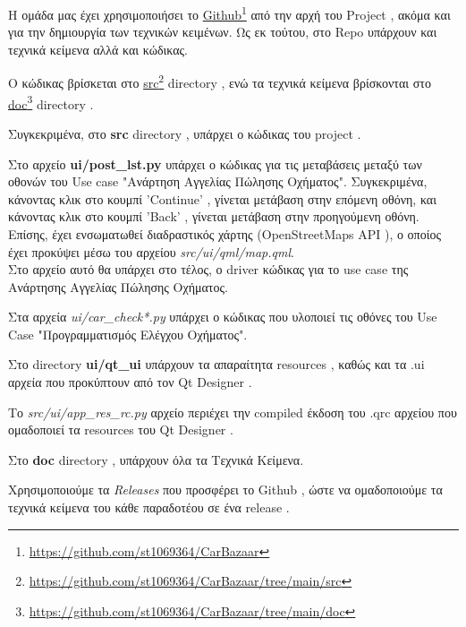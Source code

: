 \documentclass{../ol-softwaremanual}
\newcommand{\doclink}[2]{\href{#1}{#2}\footnote{\url{#1}}}
\begin{document}
	\flushleft
	
	Η ομάδα μας έχει χρησιμοποιήσει το \en \doclink{https://github.com/st1069364/CarBazaar}{Github} \gr από την αρχή του \en Project \gr, ακόμα και για την δημιουργία των τεχνικών κειμένων. Ως εκ τούτου, στο \en Repo \gr υπάρχουν και τεχνικά κείμενα αλλά και κώδικας. \break
	
	
	Ο κώδικας βρίσκεται στο \en \doclink{https://github.com/st1069364/CarBazaar/tree/main/src}{src} directory \gr, ενώ τα τεχνικά κείμενα βρίσκονται στο \en \doclink{https://github.com/st1069364/CarBazaar/tree/main/doc}{doc} directory \gr .\break
	
	Συγκεκριμένα, στο \en \textbf{src} directory \gr, υπάρχει ο κώδικας του \en project \gr. \break
	
	Στο αρχείο \en \textbf{ui/post\_lst.py} \gr υπάρχει ο κώδικας για τις μεταβάσεις μεταξύ των οθονών του \en Use case \gr \en"\gr Ανάρτηση Αγγελίας Πώλησης Οχήματος\en"\gr.  Συγκεκριμένα, κάνοντας κλικ στο κουμπί \en 'Continue' \gr , γίνεται μετάβαση στην επόμενη οθόνη, και κάνοντας κλικ στο κουμπί \en 'Back' \gr , γίνεται μετάβαση στην προηγούμενη οθόνη.
	Επίσης, έχει ενσωματωθεί διαδραστικός χάρτης (\en OpenStreetMaps API \gr), ο οποίος έχει προκύψει μέσω του αρχείου \en \textit{src/ui/qml/map.qml}\gr. \\
	
	Στο αρχείο αυτό θα υπάρχει στο τέλος, ο \en driver \gr κώδικας για το \en use case \gr της Ανάρτησης Αγγελίας Πώλησης Οχήματος. \break
	
	Στα αρχεία \en \textit{ui/car\_check*.py} \gr υπάρχει ο κώδικας που υλοποιεί τις οθόνες του \en Use Case "\gr Προγραμματισμός Ελέγχου Οχήματος\en"\gr. \break 
	
	 \break
		
	  \break
	
	
	
	Στο \en directory \textbf{ui/qt\_ui} \gr υπάρχουν τα απαραίτητα \en resources \gr, καθώς και τα \en .ui \gr αρχεία που προκύπτουν από τον \en Qt Designer \gr. \break	
	
	Το \en \textit{src/ui/app\_res\_rc.py} \gr αρχείο περιέχει την \en compiled \gr έκδοση του \en .qrc \gr αρχείου που ομαδοποιεί τα \en resources \gr του \en Qt Designer \gr.
	
	
	Στο \en \textbf{doc} directory \gr, υπάρχουν όλα τα Τεχνικά Κείμενα. \break
	
	Χρησιμοποιούμε τα \en \textit{Releases} \gr που προσφέρει το \en Github \gr, ώστε να ομαδοποιούμε τα τεχνικά κείμενα του κάθε παραδοτέου σε ένα \en release \gr .
	
	
	
	
	
	
	
	
	
	
\end{document}
